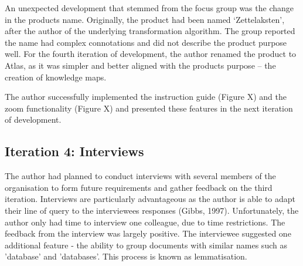 \documentclass{article}
\begin{document}
\begin{table}[]
\centering
\caption{The functional requirements and use cases that defined the third iteration of Atlas.}
\label{tab:my-table}
\end{table}

An unexpected development that stemmed from the focus group was the change in the products name. Originally, the product had been named ‘Zettelaksten’, after the author of the underlying transformation algorithm. The group reported the name had complex connotations and did not describe the product purpose well. For the fourth iteration of development, the author renamed the product to Atlas, as it was simpler and better aligned with the products purpose – the creation of knowledge maps.

The author successfully implemented the instruction guide (Figure X) and the zoom functionality (Figure X) and presented these features in the next iteration of development.

\subsection{Iteration 4: Interviews}

The author had planned to conduct interviews with several members of the organisation to form future requirements and gather feedback on the third iteration. Interviews are particularly advantageous as the author is able to adapt their line of query to the interviewees responses (Gibbs, 1997). Unfortunately, the author only had time to interview one colleague, due to time restrictions. The feedback from the interview was largely positive. The interviewee suggested one additional feature - the ability to group documents with similar names such as 'database' and 'databases'. This process is known as lemmatisation.
\end{document}
